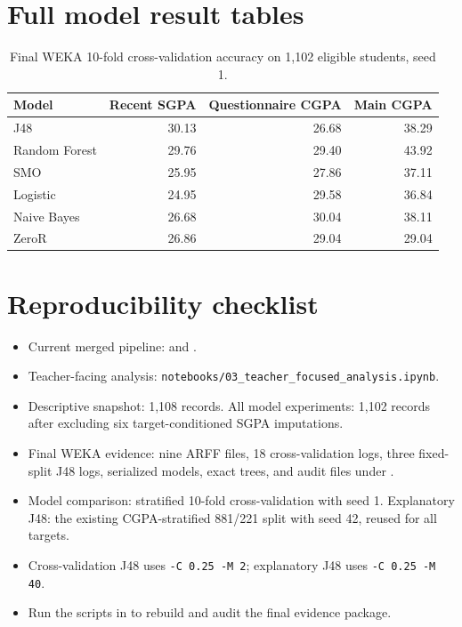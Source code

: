 \documentclass[11pt,a4paper]{article}
\newcommand{\code}[1]{\texttt{#1}}
\begin{document}
\section{Full model result tables}
\begin{table}[H]\centering\small
\caption{Final WEKA 10-fold cross-validation accuracy on 1,102 eligible students, seed 1.}\label{tab:weka-full}
\begin{tabular}{lrrr}\toprule
Model&Recent SGPA&Questionnaire CGPA&Main CGPA\\\midrule
J48&30.13&26.68&38.29\\
Random Forest&29.76&29.40&43.92\\
SMO&25.95&27.86&37.11\\
Logistic&24.95&29.58&36.84\\
Naive Bayes&26.68&30.04&38.11\\
ZeroR&26.86&29.04&29.04\\\bottomrule
\end{tabular}
\end{table}

\section{Reproducibility checklist}
\begin{itemize}
\item Current merged pipeline:  and .
\item Teacher-facing analysis: \code{notebooks/03\_teacher\_focused\_analysis.ipynb}.
\item Descriptive snapshot: 1,108 records. All model experiments: 1,102 records after excluding six target-conditioned SGPA imputations.
\item Final WEKA evidence: nine ARFF files, 18 cross-validation logs, three fixed-split J48 logs, serialized models, exact trees, and audit files under .
\item Model comparison: stratified 10-fold cross-validation with seed 1. Explanatory J48: the existing CGPA-stratified 881/221 split with seed 42, reused for all targets.
\item Cross-validation J48 uses \code{-C 0.25 -M 2}; explanatory J48 uses \code{-C 0.25 -M 40}.
\item Run the scripts in  to rebuild and audit the final evidence package.
\end{itemize}
\end{document}
